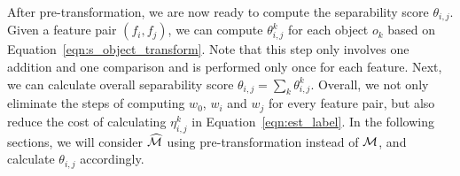 {{After pre-transformation, we are now ready
to compute the separability score $\theta_{i,j}$.
Given a feature pair $(f_i,f_j)$, we can compute $\theta_{i,j}^{k}$
for each object $o_k$ based on Equation~\ref{eqn:s_object_transform}.}
Note that this step only involves one addition and one comparison and is performed only once for each feature.
Next, we can calculate overall separability score $\theta_{i,j} = \sum_{k}{\theta_{i,j}^{k}}$. Overall,
we not only eliminate the steps of computing
$w_0$, $w_i$ and $w_j$ for every feature pair,
but also reduce the cost of calculating
$\eta_{i,j}^{k}$ in Equation~\ref{eqn:est_label}.
In the following sections,
we will consider $\widehat{{\mathcal{M}}}$ using pre-transformation instead of ${\mathcal{M}}$, and calculate $\theta_{i,j}$ accordingly.}



